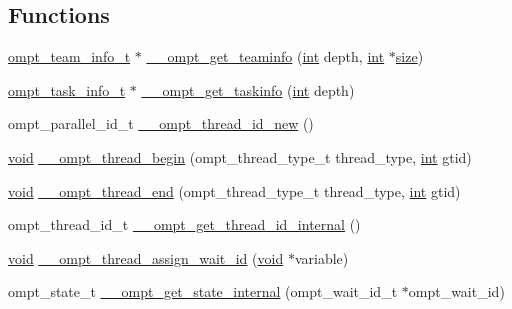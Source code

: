 \subsection*{Functions}
\begin{DoxyCompactItemize}
\item 
\hyperlink{structompt__team__info__t}{ompt\-\_\-team\-\_\-info\-\_\-t} $\ast$ \hyperlink{ompt-specific_8c_a89edd4fa7a424dfc144f73cedde5116c}{\-\_\-\-\_\-ompt\-\_\-get\-\_\-teaminfo} (\hyperlink{ittnotify__static_8h_a8b8dcd723308a8cb5d84277c7a3fff70}{int} depth, \hyperlink{ittnotify__static_8h_a8b8dcd723308a8cb5d84277c7a3fff70}{int} $\ast$\hyperlink{ittnotify__static_8h_a5a1daa0c1d342747e3884fa54fc64fb1}{size})
\item 
\hyperlink{structompt__task__info__t}{ompt\-\_\-task\-\_\-info\-\_\-t} $\ast$ \hyperlink{ompt-specific_8c_a31168da811886ba5fef353af949900b3}{\-\_\-\-\_\-ompt\-\_\-get\-\_\-taskinfo} (\hyperlink{ittnotify__static_8h_a8b8dcd723308a8cb5d84277c7a3fff70}{int} depth)
\item 
ompt\-\_\-parallel\-\_\-id\-\_\-t \hyperlink{ompt-specific_8c_a20defde93de9c4e3d89e2761c2804342}{\-\_\-\-\_\-ompt\-\_\-thread\-\_\-id\-\_\-new} ()
\item 
\hyperlink{ittnotify__static_8h_af941d56e55e3c5465135b60c4d6343ed}{void} \hyperlink{ompt-specific_8c_ac67291ade668df85fa534e15aa1041e6}{\-\_\-\-\_\-ompt\-\_\-thread\-\_\-begin} (ompt\-\_\-thread\-\_\-type\-\_\-t thread\-\_\-type, \hyperlink{ittnotify__static_8h_a8b8dcd723308a8cb5d84277c7a3fff70}{int} gtid)
\item 
\hyperlink{ittnotify__static_8h_af941d56e55e3c5465135b60c4d6343ed}{void} \hyperlink{ompt-specific_8c_a6df3ac9845bff98373f885b319bc2e38}{\-\_\-\-\_\-ompt\-\_\-thread\-\_\-end} (ompt\-\_\-thread\-\_\-type\-\_\-t thread\-\_\-type, \hyperlink{ittnotify__static_8h_a8b8dcd723308a8cb5d84277c7a3fff70}{int} gtid)
\item 
ompt\-\_\-thread\-\_\-id\-\_\-t \hyperlink{ompt-specific_8c_a1457c80054745fe7a7a7cfbc79d5fa09}{\-\_\-\-\_\-ompt\-\_\-get\-\_\-thread\-\_\-id\-\_\-internal} ()
\item 
\hyperlink{ittnotify__static_8h_af941d56e55e3c5465135b60c4d6343ed}{void} \hyperlink{ompt-specific_8c_a0d15ff86baf709cfb2701472bf0acf8b}{\-\_\-\-\_\-ompt\-\_\-thread\-\_\-assign\-\_\-wait\-\_\-id} (\hyperlink{ittnotify__static_8h_af941d56e55e3c5465135b60c4d6343ed}{void} $\ast$variable)
\item 
ompt\-\_\-state\-\_\-t \hyperlink{ompt-specific_8c_a635eaf6bb94d21b06530f1e9773401e6}{\-\_\-\-\_\-ompt\-\_\-get\-\_\-state\-\_\-internal} (ompt\-\_\-wait\-\_\-id\-\_\-t $\ast$ompt\-\_\-wait\-\_\-id)

\end{DoxyCompactItemize}

